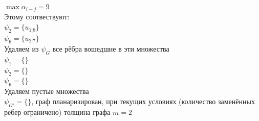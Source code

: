 \documentclass[12pt,a4paper]{report}
\begin{document}
\hfill\break
$\max\alpha_{i-j}=9$\\
Этому соотвествуют:\\
$\psi_{2} = \{u_{1 | 8}\}$ \\
$\psi_{6} = \{u_{2 | 7}\}$ \\
Удаляем из $\psi_G$ все рёбра вошедшие в эти множества\\
$\psi_{1} = \{\}$ \\
$\psi_{2} = \{\}$ \\
$\psi_{6} = \{\}$ \\
Удаляем пустые множества\\
$\psi_{G'}=\{\}$, граф планаризирован, при текущих условиях (количество заменённых ребер ограничено) толщина графа $m=2$
\end{document}
